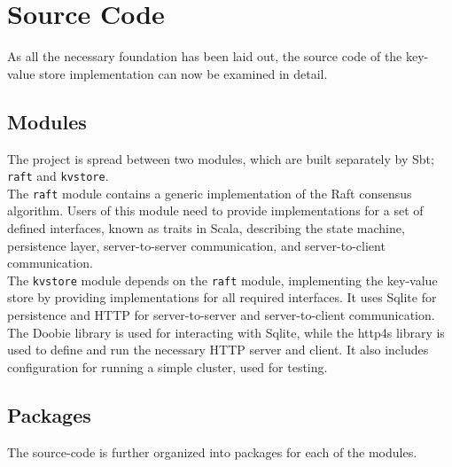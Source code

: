 \section{Source Code}

As all the necessary foundation has been laid out, the source code of the key-value store implementation can now be examined in detail.

\subsection{Modules}

The project is spread between two modules, which are built separately by Sbt; \lstinline|raft| and \lstinline|kvstore|.\\

The \lstinline|raft| module contains a generic implementation of the Raft consensus algorithm. Users of this module need to provide implementations for a set of defined interfaces, known as traits in Scala, describing the state machine, persistence layer, server-to-server communication, and server-to-client communication.\\

The \lstinline|kvstore| module depends on the \lstinline|raft| module, implementing the key-value store by providing implementations for all required interfaces. It uses Sqlite for persistence and HTTP for server-to-server and server-to-client communication. The Doobie library is used for interacting with Sqlite, while the http4s library is used to define and run the necessary HTTP server and client. It also includes configuration for running a simple cluster, used for testing.

\subsection{Packages}

The source-code is further organized into packages for each of the modules.\\


